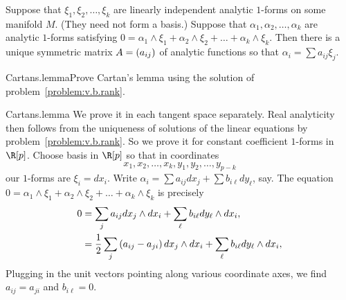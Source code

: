 \begin{lemma}\label{lemma:Cartans}
Suppose that \(\xi_1, \xi_2, \dots, \xi_k\) are linearly independent analytic \(1\)-forms on some manifold \(M\).
(They need not form a basis.)
Suppose that \(\alpha_1, \alpha_2, \dots, \alpha_k\) are analytic \(1\)-forms satisfying \(0=\alpha_1 \wedge \xi_1 + \alpha_2 \wedge \xi_2 + \dots + \alpha_k \wedge \xi_k\).
Then there is a unique symmetric matrix \(A=\left(a_{ij}\right)\) of analytic functions so that \(\alpha_i = \sum a_{ij} \xi_j\).
\end{lemma}
\begin{problem}{Cartans.lemma}Prove Cartan's lemma using the solution of problem~\ref{problem:v.b.rank}.
\end{problem}
\begin{answer}{Cartans.lemma}
We prove it in each tangent space separately.
Real analyticity then follows from the uniqueness of solutions of the linear equations by problem~\vref{problem:v.b.rank}.
So we prove it for constant coefficient \(1\)-forms in \(\R[p]\).
Choose  basis in \(\R[p]\) so that in coordinates 
\[
x_1, x_2, \dots, x_k, y_1, y_2, \dots, y_{p-k}
\]
our \(1\)-forms are \(\xi_i = dx_i\).
Write \(\alpha_i = \sum a_{ij} dx_j + \sum b_{i\ell} dy_{\ell}\), say.
The equation \(0=\alpha_1 \wedge \xi_1 + \alpha_2 \wedge \xi_2 + \dots + \alpha_k \wedge \xi_k\) is precisely
\begin{align*}
0 &= 
\sum_j a_{ij} dx_j \wedge dx_i +
\sum_{\ell} b_{i\ell} dy_{\ell} \wedge dx_i,
\\
&=
\frac{1}{2}\sum_j \left(a_{ij}-a_{ji}\right) dx_j \wedge dx_i +
\sum_{\ell} b_{i\ell} dy_{\ell} \wedge dx_i,
\end{align*}
Plugging in the unit vectors pointing along various coordinate axes, we find \(a_{ij}=a_{ji}\) and \(b_{i{\ell}}=0\).
\end{answer}

